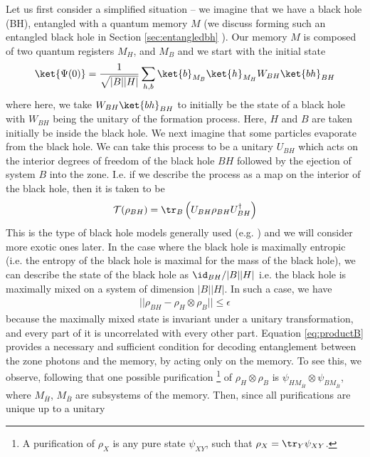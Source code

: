 \documentclass[11pt,a4paper]{article}
\begin{document}
Let us first consider a simplified situation -- we imagine that we have a black hole (BH), entangled with a quantum memory $M$ (we discuss forming such an entangled black hole in Section \ref{sec:entangledbh} ). Our memory $M$ is composed of two quantum registers $M_H$, and $M_B$  and we start with the initial state
\begin{align}
\ket{\Psi(0)}=\frac{1}{\sqrt{|B||H|}}
\sum_{h,b}\ket{b}_{M_B}\ket{h}_{M_H} W_{BH} \ket{bh}_{BH}
\label{eq:initial}
\end{align}
where here, we take $W_{BH}\ket{bh}_{BH}$ to initially be the state of a black hole with $W_{BH}$ being the unitary of the formation
process.  Here, $H$ and $B$ are taken initially be inside the black hole.  
We next imagine that some particles evaporate from the black hole. We can take this process to be a unitary $U_{BH}$ which acts on the interior degrees of freedom of the black hole $BH$ followed by the ejection of system $B$ into the zone.  I.e. if we describe the process as a map on the interior of the black hole, then it is taken to be
\begin{align}
{\cal T}(\rho_{BH})=\tr_B \left( U_{BH}\rho_{BH}U^\dagger_{BH}\right)
\label{eq:page-map}
\end{align}
This is the type of black hole models generally used (e.g. \cite{page-unitary-evap,bhlock,HaydenPreskill,sekino2008fast,giddings2013quantum}) and we will consider more exotic ones later.  In the case where the black hole is maximally entropic (i.e. the entropy of the black hole is maximal for the mass of the black hole), we can describe the state of the black hole as $\id_{BH}/|B||H|$ i.e. the black hole is maximally mixed on a system of dimension $|B||H|$. In such a case, we have 
\begin{align}
||\rho_{BH}-\rho_{H}\otimes\rho_{B}||\leq \epsilon
\label{eq:productB}
\end{align}
because the maximally mixed state is invariant under a unitary transformation, and every part of it is uncorrelated with every other part. 
Equation \eqref{eq:productB} provides a necessary and sufficient condition for decoding entanglement between the zone photons and the memory, by acting only on the memory. To see this, we observe, following\cite{how-merge,how-merge2} that one possible purification
\footnote{A purification of $\rho_X$ is any pure state $\psi_{XY}$, such that $\rho_X=\tr_Y\psi_{XY}$.}
 of $\rho_{H}\otimes\rho_{B}$ is $\psi_{HM_{\overline{H}}}\otimes
\psi_{BM_{\overline{B}}}$,  where $M_{\overline{H}}$, $M_{\overline{B}}$ are subsystems of the memory. Then, since all purifications are unique up to a unitary
\end{document}
